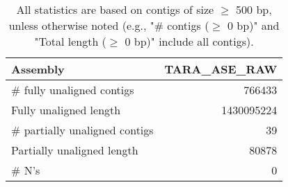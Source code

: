 \documentclass[12pt,a4paper]{article}
\begin{document}
\begin{table}[ht]
\begin{center}
\caption{All statistics are based on contigs of size $\geq$ 500 bp, unless otherwise noted (e.g., "\# contigs ($\geq$ 0 bp)" and "Total length ($\geq$ 0 bp)" include all contigs).}
\begin{tabular}{|l*{1}{|r}|}
\hline
Assembly & TARA\_ASE\_RAW \\ \hline
\# fully unaligned contigs & 766433 \\ \hline
Fully unaligned length & 1430095224 \\ \hline
\# partially unaligned contigs & 39 \\ \hline
Partially unaligned length & 80878 \\ \hline
\# N's & 0 \\ \hline
\end{tabular}
\end{center}
\end{table}
\end{document}
